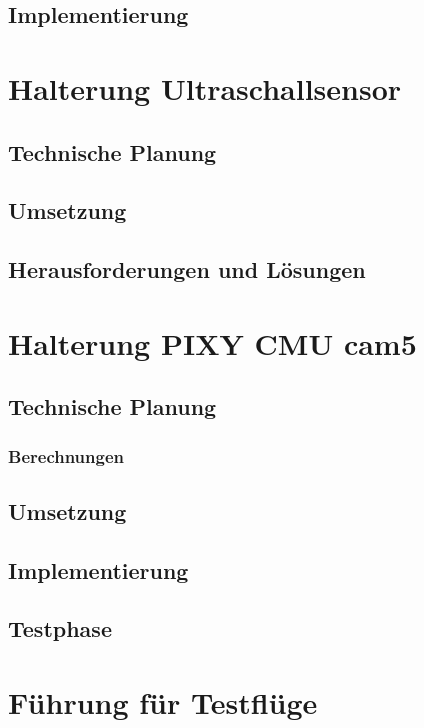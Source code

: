 	\subsection{Implementierung}

\section{Halterung Ultraschallsensor}

	\subsection{Technische Planung}

	\subsection{Umsetzung}

	\subsection{Herausforderungen und Lösungen}

\section{Halterung PIXY CMU cam5}

	\subsection{Technische Planung}

		\subsubsection{Berechnungen}

	\subsection{Umsetzung}

	\subsection{Implementierung}

	\subsection{Testphase}

\section{Führung für Testflüge}

